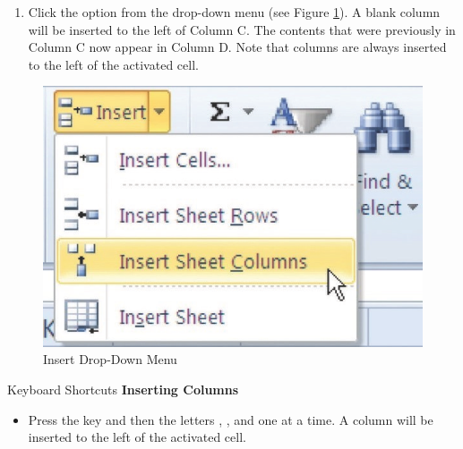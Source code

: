 \begin{enumerate}[resume]
	\item Click the  option from the drop-down menu (see Figure \ref{01:fig29}). A blank column will be inserted to the left of Column C. The contents that were previously in Column C now appear in Column D. Note that columns are always inserted to the left of the activated cell.

\end{enumerate}

\begin{figure}[H]
	\centering
	\includegraphics[width=\maxwidth{.95\linewidth}]{gfx/ch01_fig29}
	\caption{Insert Drop-Down Menu}
	\label{01:fig29}
\end{figure}

\begin{center}
	\begin{shtcutbox}{Keyboard Shortcuts}
		\textbf{Inserting Columns}
		\\
		\begin{itemize}
			\setlength{\itemsep}{0pt}
			\setlength{\parskip}{0pt}
			\setlength{\parsep}{0pt}
			
			\item Press the  key and then the letters , , and  one at a time. A column will be inserted to the left of the activated cell.
			
		\end{itemize}
	\end{shtcutbox}
\end{center}

